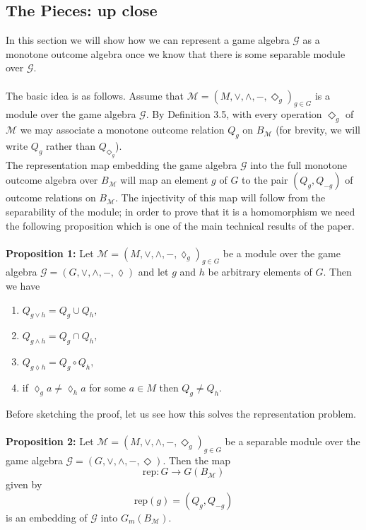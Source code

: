 \documentclass[12pt]{article}
\begin{document}
\subsection{The Pieces: up close}
In this section we will show how we can represent a game algebra $\mathcal{G}$ as a monotone outcome algebra once we know that there is some separable module over $\mathcal{G}$. \\ \\
The basic idea is as follows. Assume that 
$\mathcal{M} = (M, \vee, \wedge, -, \Diamond_{g})_{g \in G}$
is a module over the game algebra $\mathcal{G}$. By Definition 3.5, with every operation $\Diamond_{g}$ of $\mathcal{M}$ we may associate a monotone outcome relation $Q_{g}$ on $B_{\mathcal{M}}$ (for brevity, we will write $Q_{g}$ rather than $Q_{\Diamond_{g}}$). \\
The representation map embedding the game algebra $\mathcal{G}$ into the full monotone outcome algebra over $B_{\mathcal{M}}$ will map an element $g$ of $G$ to the pair $(Q_{g}, Q_{-g})$ of outcome relations on $B_{\mathcal{M}}$. The injectivity of this map will follow from the separability of the module; in order to prove that it is a homomorphism we need the following proposition which is one of the main technical results of the paper.\\ \\
\textbf{Proposition 1:} Let $\mathcal{M} = (M, \vee, \wedge, -, \lozenge_{g})_{g \in G}$ be a module over the game algebra $\mathcal{G} = (G, \vee, \wedge, -, \lozenge)$
and let $g$ and $h$ be arbitrary elements of $G$. Then we have
\begin{enumerate}
  \item $Q_{g \vee h} = Q_{g} \cup Q_{h},$
  \item $Q_{g \wedge h} = Q_{g} \cap Q_{h},$
  \item $Q_{g \lozenge h} = Q_{g} \circ Q_{h},$
  \item if $\lozenge_{g} a \neq \lozenge_{h} a$ for some $a \in M$ then $Q_{g} \neq Q_{h}.$
\end{enumerate}
Before sketching the proof, let us see how this solves the representation problem. \\ \\
\textbf{Proposition 2:} 
Let $\mathcal{M} = (M, \vee, \wedge, -, \Diamond_g)_{g \in G}$ be a separable module over the game algebra 
$\mathcal{G} = (G, \vee, \wedge, -, \Diamond)$. Then the map 
\[
\mathrm{rep} : G \to G(B_{\mathcal{M}})
\]
given by
\[
\mathrm{rep}(g) = (Q_g, Q_{-g})
\]
is an embedding of $\mathcal{G}$ into $G_m(B_{\mathcal{M}})$. \\ \\
\end{document}
